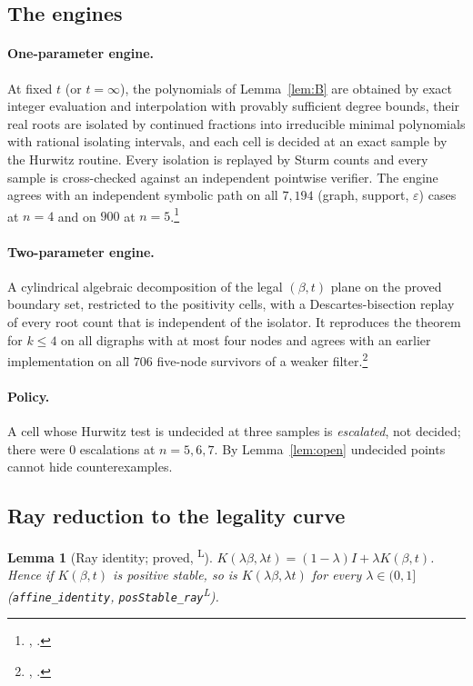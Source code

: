 \documentclass[11pt]{article}
\newtheorem{lemma}[theorem]{Lemma}
\theoremstyle{definition}
\newcommand{\eps}{\varepsilon}
\newcommand{\lean}{\textsuperscript{\textsf{L}}}
\begin{document}
\subsection{The engines}
\paragraph{One-parameter engine.} At fixed $t$ (or $t=\infty$), the polynomials of Lemma~\ref{lem:B} are obtained by
exact integer evaluation and interpolation with provably sufficient degree bounds, their real roots are isolated by
continued fractions into irreducible minimal polynomials with rational isolating intervals, and each cell is decided
at an exact sample by the Hurwitz routine. Every isolation is replayed by Sturm counts and every sample is
cross-checked against an independent pointwise verifier. The engine agrees with an independent symbolic path on
all $7{,}194$ (graph, support, $\eps$) cases at $n=4$ and on $900$ at $n=5$.\footnote{, .}

\paragraph{Two-parameter engine.} A cylindrical algebraic decomposition of the legal $(\beta,t)$ plane on the proved
boundary set, restricted to the positivity cells, with a Descartes-bisection replay of every root count that is
independent of the isolator. It reproduces the theorem for $k\le4$ on all digraphs with at most four nodes and agrees
with an earlier implementation on all $706$ five-node survivors of a weaker filter.\footnote{, .}

\paragraph{Policy.} A cell whose Hurwitz test is undecided at three samples is \emph{escalated}, not decided; there were $0$
escalations at $n=5,6,7$. By Lemma~\ref{lem:open} undecided points cannot hide counterexamples.

\subsection{Ray reduction to the legality curve}
\begin{lemma}[Ray identity; proved, \lean]\label{lem:rayF}
$K(\lambda\beta,\lambda t)=(1-\lambda)I+\lambda K(\beta,t)$. Hence if $K(\beta,t)$ is positive stable, so is
$K(\lambda\beta,\lambda t)$ for every $\lambda\in(0,1]$ (\texttt{affine\_identity}, \texttt{posStable\_ray}\lean).
\end{lemma}
\end{document}
